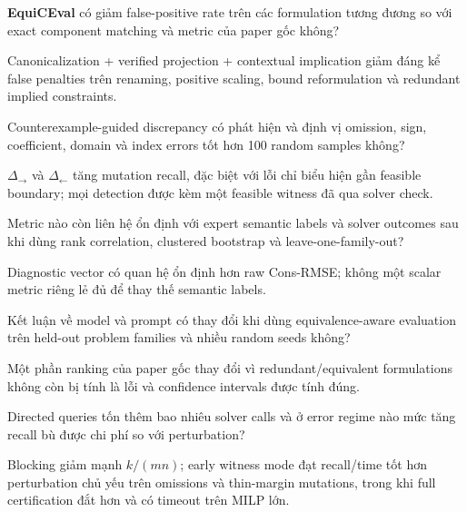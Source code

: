 \documentclass[11pt,a4paper]{article}
\newcommand{\method}{\textsf{\textbf{EquiCEval}}\xspace}
\begin{document}
\begin{description}[leftmargin=1.8em,labelindent=0em,labelsep=0.5em,style=nextline]
  \item[\textbf{RQ1 -- Equivalence invariance.}]
  \method có giảm false-positive rate trên các formulation tương đương so với
  exact component matching và metric của paper gốc không?

  \item[\textbf{H1.}]
  Canonicalization + verified projection + contextual implication giảm đáng kể
  false penalties trên renaming, positive scaling, bound reformulation và
  redundant implied constraints.

  \item[\textbf{RQ2 -- Error sensitivity và localization.}]
  Counterexample-guided discrepancy có phát hiện và định vị omission, sign,
  coefficient, domain và index errors tốt hơn 100 random samples không?

  \item[\textbf{H2.}]
  \(\Delta_{\rightarrow}\) và \(\Delta_{\leftarrow}\) tăng mutation recall,
  đặc biệt với lỗi chỉ biểu hiện gần feasible boundary; mọi detection được
  kèm một feasible witness đã qua solver check.

  \item[\textbf{RQ3 -- Robust relationship với correctness.}]
  Metric nào còn liên hệ ổn định với expert semantic labels và solver outcomes
  sau khi dùng rank correlation, clustered bootstrap và leave-one-family-out?

  \item[\textbf{H3.}]
  Diagnostic vector có quan hệ ổn định hơn raw Cons-RMSE; không một scalar
  metric riêng lẻ đủ để thay thế semantic labels.

  \item[\textbf{RQ4 -- Ranking stability.}]
  Kết luận về model và prompt có thay đổi khi dùng equivalence-aware evaluation
  trên held-out problem families và nhiều random seeds không?

  \item[\textbf{H4.}]
  Một phần ranking của paper gốc thay đổi vì redundant/equivalent formulations
  không còn bị tính là lỗi và confidence intervals được tính đúng.

  \item[\textbf{RQ5 -- Detection--cost trade-off.}]
  Directed queries tốn thêm bao nhiêu solver calls và ở error regime nào mức
  tăng recall bù được chi phí so với perturbation?

  \item[\textbf{H5.}]
  Blocking giảm mạnh \(k/(mn)\); early witness mode đạt recall/time tốt hơn
  perturbation chủ yếu trên omissions và thin-margin mutations, trong khi full
  certification đắt hơn và có timeout trên MILP lớn.
\end{description}
\end{document}
